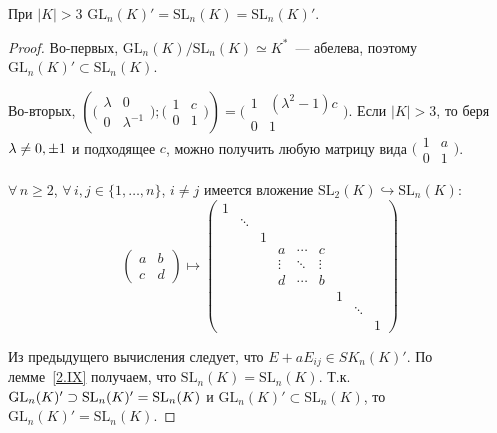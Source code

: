 \documentclass[a4paper]{article}
\newcommand*{\p}[1]{#1\nobreak\discretionary{}{\hbox{$\mathsurround=0pt #1$}}{}}
\begin{document}
\begin{theorem}
При $|K|>3$ $\mathrm{GL}_n(K)'=\mathrm{SL}_n(K)=\mathrm{SL}_n(K)'$.
\end{theorem}

\begin{proof}
Во-первых, $\mathrm{GL}_n(K)/\mathrm{SL}_n(K)\simeq K^*$~---
абелева, поэтому $\mathrm{GL}_n(K)'\subset \mathrm{SL}_n(K)$.

Во-вторых, $\left(\bigl(\begin{smallmatrix}\lambda & 0\\
0 & \lambda^{-1}\end{smallmatrix}\bigr); \bigl(\begin{smallmatrix}1
& c\\ 0 & 1\end{smallmatrix}\bigr)\right)=\bigl(\begin{smallmatrix}
1& (\lambda^2-1)c\\ 0& 1\end{smallmatrix}\bigr)$. Если $|K|>3$, то
беря $\lambda\p\neq 0, \pm1$ и подходящее $c$, можно получить любую
матрицу вида $\bigl(\begin{smallmatrix}1& a\\
0& 1\end{smallmatrix}\bigr)$.

$\forall \, n\geqslant 2$, $\forall \, i,j\in\{1,\ldots,n\}$, $i\neq
j$ имеется вложение $\mathrm{SL}_2(K)\hookrightarrow
\mathrm{SL}_n(K)$:
$$\begin{pmatrix}a& b\\ c& d\end{pmatrix}\mapsto
\left(
\begin{smallmatrix}
1 & & & & & & & & \\
  &\ddots & & & & & & & \\
 & & 1& & & & & & \\
 & & &a &\cdots & c & \\
 & & &\vdots & \ddots &\vdots & & & \\
 & & &d &\cdots & b& & & \\
 & & & & & & 1& & \\
 & & & & & & & \ddots &\\
 & & & & & & & & 1
\end{smallmatrix}\right)
$$

Из предыдущего вычисления следует, что $E+aE_{ij}\in SK_n(K)'$. По
лемме~\ref{2.IX} получаем, что $\mathrm{SL}_n(K)=\mathrm{SL}_n(K)$.
Т.к. $\mathrm{GL}_n(K)'\supset \mathrm{SL}_n(K)'\p=\mathrm{SL}_n(K)$
и $\mathrm{GL}_n(K)'\subset \mathrm{SL}_n(K)$, то
$\mathrm{GL}_n(K)'=\mathrm{SL}_n(K)$.
\end{proof}
\end{document}
